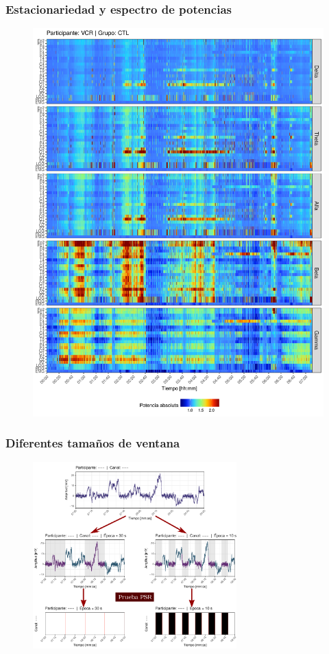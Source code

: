 \documentclass[serif,mathserif,professionalfont]{beamer}
\begin{document}
\begin{frame}\frametitle{Estacionariedad y espectro de potencias}
\begin{figure}
\centering
\includegraphics[width=0.55\linewidth]
{./img_art_dfa/VCNNS1_espectral_total.png}
\end{figure}
\end{frame}


\begin{frame}\frametitle{Diferentes tamaños de ventana}
\begin{figure}
\includegraphics[width=0.7\textwidth]
{./img_diagramas/epocas_diferentes_v3.pdf}
\end{figure}
\end{frame}

\end{document}
